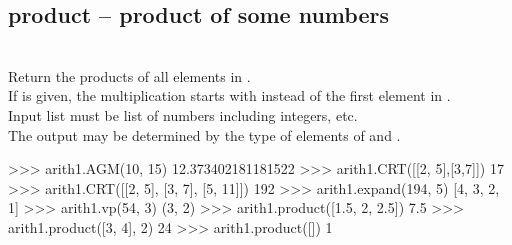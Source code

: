 \subsection{product -- product of some numbers}
\\
\spacing
\quad Return the products of all elements in . \\
\spacing
\quad If  is given, the multiplication starts with  instead of the first element in .\\
\spacing
\quad Input list  must be list of numbers including integers,  etc.\\
The output  may be determined by the type of elements of  and .\\
%
\begin{ex}
>>> arith1.AGM(10, 15)
12.373402181181522
>>> arith1.CRT([[2, 5],[3,7]])
17
>>> arith1.CRT([[2, 5], [3, 7], [5, 11]])
192
>>> arith1.expand(194, 5)
[4, 3, 2, 1]
>>> arith1.vp(54, 3)
(3, 2)
>>> arith1.product([1.5, 2, 2.5])
7.5
>>> arith1.product([3, 4], 2)
24
>>> arith1.product([])
1
\end{ex}




